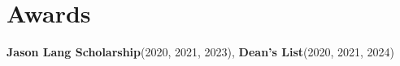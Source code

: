\documentclass[A4,10pt]{article}
\newcommand{\resumeItem}[1]{
  \item\small{
    {#1 \vspace{-2pt}}
  }
}
\newcommand{\resumeItemListStart}{\begin{itemize}}
\newcommand{\resumeItemListEnd}{\end{itemize}\vspace{-5pt}}
\begin{document}
%

\section{Awards}
 \begin{itemize}[leftmargin=0.15in, label={}]
  \small{\item{
   \textbf{Jason Lang Scholarship}{(2020, 2021, 2023),} \textbf{Dean's List}{(2020, 2021, 2024)}
  }}
\end{itemize}
\end{document}
